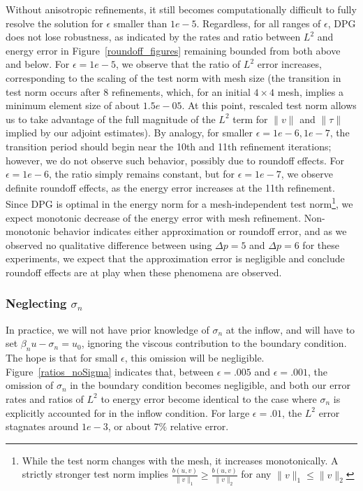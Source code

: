 Without anisotropic refinements, it still becomes computationally difficult to fully resolve the solution for $\epsilon$ smaller than $1e-5$. Regardless, for all ranges of $\epsilon$, DPG does not lose robustness, as indicated by the rates and ratio between $L^2$ and energy error in Figure~\ref{roundoff_figures} remaining bounded from both above and below. For $\epsilon = 1e-5$, we observe that the ratio of $L^2$ error increases, corresponding to the scaling of the test norm with mesh size (the transition in test norm occurs after 8 refinements, which, for an initial $4\times 4$ mesh, implies a minimum element size of about $1.5e-05$. At this point, rescaled test norm allows us to take advantage of the full magnitude of the $L^2$ term for $\|v\|$ and $\|\tau\|$ implied by our adjoint estimates). By analogy, for smaller $\epsilon = 1e-6, 1e-7$, the transition period should begin near the 10th and 11th refinement iterations; however, we do not observe such behavior, possibly due to roundoff effects. 
For $\epsilon=1e-6$, the ratio simply remains constant, but for $\epsilon=1e-7$, we observe definite roundoff effects, as the energy error increases at the 11th refinement. Since DPG is optimal in the energy norm for a mesh-independent test norm\footnote{While the test norm changes with the mesh, it increases monotonically. A strictly stronger test norm implies $\frac{b(u,v)}{\|v\|_1} \geq \frac{b(u,v)}{\|v\|_2}$ for any $\|v\|_1 \leq \|v\|_2$}, we expect monotonic decrease of the energy error with mesh refinement. Non-monotonic behavior indicates either approximation or roundoff error, and as we observed no qualitative difference between using $\Delta p = 5$ and $\Delta p = 6$ for these experiments, we expect that the approximation error is negligible and conclude roundoff effects are at play when these phenomena are observed. 


\subsubsection{Neglecting $\sigma_n$}

In practice, we will not have prior knowledge of $\sigma_n$ at the inflow, and will have to set $\beta_n u - \sigma_n = u_0$, ignoring the viscous contribution to the boundary condition.  The hope is that for small $\epsilon$, this omission will be negligible. Figure~\ref{ratios_noSigma} indicates that, between $\epsilon = .005$ and $\epsilon = .001$, the omission of $\sigma_n$ in the boundary condition becomes negligible, and both our error rates and ratios of $L^2$ to energy error become identical to the case where $\sigma_n$ is explicitly accounted for in the inflow condition. For large $\epsilon = .01$, the $L^2$ error stagnates around $1e-3$, or about $7\%$ relative error. 

